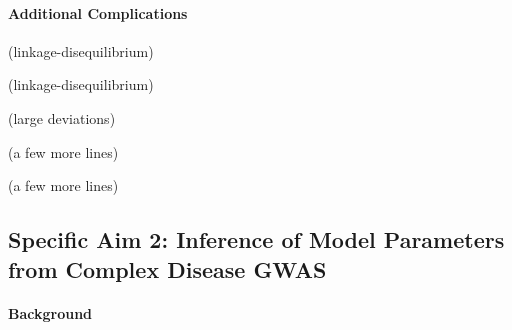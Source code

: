 \documentclass[11pt]{article}
\newcommand{\jb}[1]{{\color{blue} (#1)} }
\begin{document}
\paragraph{Additional Complications}

\jb{linkage-disequilibrium}

\jb{linkage-disequilibrium}

\jb{large deviations}

\jb{a few more lines}

\jb{a few more lines}


\subsection*{Specific Aim 2: Inference of Model Parameters from Complex Disease GWAS}

\paragraph{Background}
\end{document}
